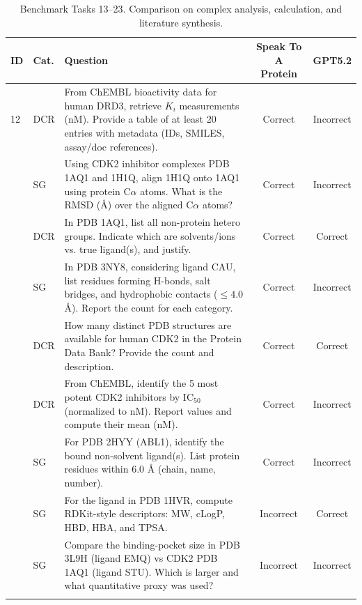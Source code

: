 \documentclass{article}
\begin{document}
\begin{table}[h]
\caption{Benchmark Tasks 13--23. Comparison on complex analysis, calculation, and literature synthesis.}
\centering
\small
\begin{tabularx}{\textwidth}{p{0.4cm} p{0.6cm} X c c}
\toprule
\textbf{ID} & \textbf{Cat.} & \textbf{Question} & \textbf{Speak To A Protein} & \textbf{GPT5.2} \\
\midrule
12 & DCR & From ChEMBL bioactivity data for human DRD3, retrieve $K_i$ measurements (nM). Provide a table of at least 20 entries with metadata (IDs, SMILES, assay/doc references). & Correct & Incorrect \\ \addlinespace
13 & SG & Using CDK2 inhibitor complexes PDB 1AQ1 and 1H1Q, align 1H1Q onto 1AQ1 using protein C$\alpha$ atoms. What is the RMSD (\AA{}) over the aligned C$\alpha$ atoms? & Correct & Incorrect \\ \addlinespace
14 & DCR & In PDB 1AQ1, list all non-protein hetero groups. Indicate which are solvents/ions vs. true ligand(s), and justify. & Correct & Correct \\ \addlinespace
15 & SG & In PDB 3NY8, considering ligand CAU, list residues forming H-bonds, salt bridges, and hydrophobic contacts ($\le 4.0$ \AA{}). Report the count for each category. & Correct & Incorrect \\ \addlinespace
16 & DCR & How many distinct PDB structures are available for human CDK2 in the Protein Data Bank? Provide the count and description. & Correct & Correct \\ \addlinespace
17 & DCR & From ChEMBL, identify the 5 most potent CDK2 inhibitors by IC$_{50}$ (normalized to nM). Report values and compute their mean (nM). & Correct & Incorrect \\ \addlinespace
18 & SG & For PDB 2HYY (ABL1), identify the bound non-solvent ligand(s). List protein residues within 6.0 \AA{} (chain, name, number). & Correct & Incorrect \\ \addlinespace
19 & SG & For the ligand in PDB 1HVR, compute RDKit-style descriptors: MW, cLogP, HBD, HBA, and TPSA. & Incorrect & Correct \\ \addlinespace
20 & SG & Compare the binding-pocket size in PDB 3L9H (ligand EMQ) vs CDK2 PDB 1AQ1 (ligand STU). Which is larger and what quantitative proxy was used? & Incorrect & Incorrect \\ \addlinespace
\bottomrule
\end{tabularx}
\end{table}
\end{document}
